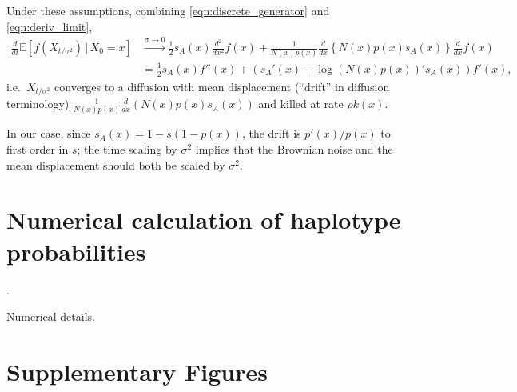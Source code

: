 \documentclass[11pt,letterpaper]{article}
\newcommand{\E}{\mathbb{E}}
\newcommand{\deriv}[1]{\frac{d}{d#1}}
\newcommand{\dderiv}[1]{\frac{d^2}{d#1^2}}
\newcommand{\given}{\,\vert\,}
\begin{document}
Under these assumptions, combining \eqref{eqn:discrete_generator} and \eqref{eqn:deriv_limit},
\begin{align}
    \deriv{t} \E[f(X_{t/\sigma^2}) \given X_0=x ] &\xrightarrow{\sigma \to 0} 
    \frac{1}{2} s_A(x) \dderiv{x} f(x) 
    + \frac{1}{N(x)p(x)} \deriv{x} \left\{ N(x)p(x) s_A(x) \right\}  \deriv{x} f(x) \\
    &= \frac{1}{2} s_A(x) f''(x) + \left( s_A'(x) + \log(N(x)p(x))' s_A(x) \right) f'(x) ,
\end{align}
i.e.\ $X_{t/\sigma^2}$ converges to a diffusion with mean displacement
(``drift'' in diffusion terminology) $\frac{1}{ N(x)p(x)} \deriv{x} ( N(x) p(x) s_A(x) )$ and killed at rate $\rho k(x)$.

In our case, since $s_A(x) = 1 - s (1-p(x))$, the drift is $p'(x)/p(x)$ to first order in $s$;
the time scaling by $\sigma^2$ implies that the Brownian noise and the mean displacement
should both be scaled by $\sigma^2$.


\section{Numerical calculation of haplotype probabilities}
\label{apx:haplotype_calcs}.

Numerical details.


\section{Supplementary Figures}

\end{document}
